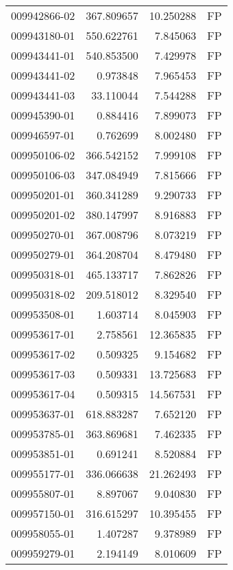 \begin{tabular}{lrrl}
009942866-02 &  367.809657 &      10.250288 &   FP \\
009943180-01 &  550.622761 &       7.845063 &   FP \\
009943441-01 &  540.853500 &       7.429978 &   FP \\
009943441-02 &    0.973848 &       7.965453 &   FP \\
009943441-03 &   33.110044 &       7.544288 &   FP \\
009945390-01 &    0.884416 &       7.899073 &   FP \\
009946597-01 &    0.762699 &       8.002480 &   FP \\
009950106-02 &  366.542152 &       7.999108 &   FP \\
009950106-03 &  347.084949 &       7.815666 &   FP \\
009950201-01 &  360.341289 &       9.290733 &   FP \\
009950201-02 &  380.147997 &       8.916883 &   FP \\
009950270-01 &  367.008796 &       8.073219 &   FP \\
009950279-01 &  364.208704 &       8.479480 &   FP \\
009950318-01 &  465.133717 &       7.862826 &   FP \\
009950318-02 &  209.518012 &       8.329540 &   FP \\
009953508-01 &    1.603714 &       8.045903 &   FP \\
009953617-01 &    2.758561 &      12.365835 &   FP \\
009953617-02 &    0.509325 &       9.154682 &   FP \\
009953617-03 &    0.509331 &      13.725683 &   FP \\
009953617-04 &    0.509315 &      14.567531 &   FP \\
009953637-01 &  618.883287 &       7.652120 &   FP \\
009953785-01 &  363.869681 &       7.462335 &   FP \\
009953851-01 &    0.691241 &       8.520884 &   FP \\
009955177-01 &  336.066638 &      21.262493 &   FP \\
009955807-01 &    8.897067 &       9.040830 &   FP \\
009957150-01 &  316.615297 &      10.395455 &   FP \\
009958055-01 &    1.407287 &       9.378989 &   FP \\
009959279-01 &    2.194149 &       8.010609 &   FP \\

\end{tabular}

